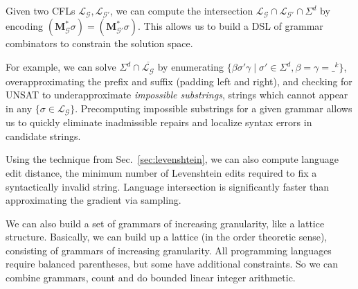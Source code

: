 \documentclass[sigplan,review,anonymous,acmsmall]{acmart}\settopmatter{printfolios=false,printccs=false,printacmref=false}
\begin{document}
Given two CFLs $\mathcal{L}_\mathcal{G}, \mathcal{L}_{\mathcal{G}'}$, we can compute the intersection $\mathcal{L}_\mathcal{G}\cap\mathcal{L}_{\mathcal{G}'}\cap\Sigma^d$ by encoding $(\mathbf{M}_\mathcal{G}^*\sigma) = (\mathbf{M}_{\mathcal{G}'}^*\sigma)$. This allows us to build a DSL of grammar combinators to constrain the solution space.

For example, we can solve $\Sigma^d \cap \overline{\mathcal{L}_\mathcal{G}}$ by enumerating $\{\beta\sigma'\gamma \mid \sigma' \in \Sigma^d, \beta = \gamma = \_^k\}$, overapproximating the prefix and suffix (padding left and right), and checking for UNSAT to underapproximate \textit{impossible substrings}, strings which cannot appear in any $\{\sigma \in \mathcal{L}_\mathcal{G}\}$. Precomputing impossible substrings for a given grammar allows us to quickly eliminate inadmissible repairs and localize syntax errors in candidate strings.

Using the technique from Sec.~\ref{sec:levenshtein}, we can also compute language edit distance, the minimum number of Levenshtein edits required to fix a syntactically invalid string. Language intersection is significantly faster than approximating the gradient via sampling.

We can also build a set of grammars of increasing granularity, like a lattice structure. Basically, we can build up a lattice (in the order theoretic sense), consisting of grammars of increasing granularity. All programming languages require balanced parentheses, but some have additional constraints. So we can combine grammars, count and do bounded linear integer arithmetic.
\end{document}
